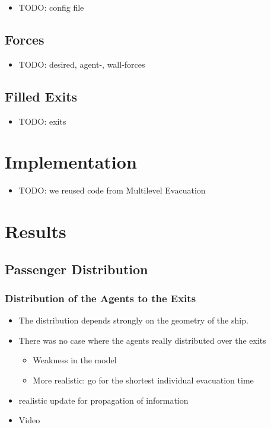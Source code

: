 \documentclass{beamer}
\begin{document}
\begin{frame}
	\begin{itemize}
		\item TODO: config file
	\end{itemize}
\end{frame}

\subsection{Forces}
\begin{frame}
	\begin{itemize}
		\item TODO: desired, agent-, wall-forces
	\end{itemize}
\end{frame}

\subsection{Filled Exits}
\begin{frame}
	\begin{itemize}
		\item TODO: exits
	\end{itemize}
\end{frame}

\section{Implementation}

\begin{frame}
	\begin{itemize}
		\item TODO: we reused code from Multilevel Evacuation
	\end{itemize}
\end{frame}

\section{Results}

\subsection{Passenger Distribution}
\begin{frame}
	\frametitle{Distribution of the Agents to the Exits}
	\begin{itemize}
		\item The distribution depends strongly on the geometry of the ship.
		\item There was no case where the agents really distributed over the exits
		\begin{itemize}
			\item Weakness in the model
			\item More realistic: go for the shortest individual evacuation time
		\end{itemize}
		\item realistic update for propagation of information
		\item Video
	\end{itemize}
\end{frame}
\end{document}
